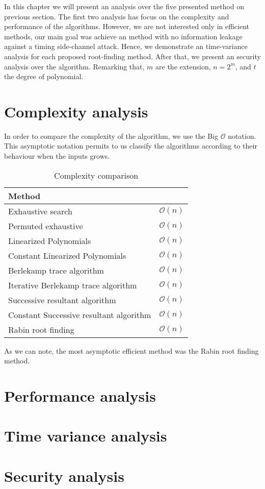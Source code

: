 In this chapter we will present an analysis over the five presented method on previous section. The first two analysis has focus on the complexity and performance of the algorithms. However, we are not interested only in efficient methods, our main goal was achieve an method with no information leakage against a timing side-channel attack. Hence, we demonstrate an time-variance analysis for each proposed root-finding method. After that, we present an security analysis over the algorithm. Remarking that, $m$ are the extension, $n = 2^m$, and $t$ the degree of polynomial.

\section{Complexity analysis}
In order to compare the complexity of the algorithm, we use the Big $\mathcal{O}$ notation. This asymptotic notation permits to us classify the algorithms according to their behaviour when the inputs grows. 




\begin{table}[ht]
\centering
\label{tab:complexity}
\caption{Complexity comparison}
\begin{tabular}{ll}
Method                                  &                \\ \hline
Exhaustive search                       & $\mathcal{O}(n)$ \\
Permuted exhaustive                     & $\mathcal{O}(n)$ \\
Linearized Polynomials                  & $\mathcal{O}(n)$ \\
Constant Linearized Polynomials         & $\mathcal{O}(n)$ \\
Berlekamp trace algorithm               & $\mathcal{O}(n)$ \\
Iterative Berlekamp trace algorithm     & $\mathcal{O}(n)$ \\
Successive resultant algorithm          & $\mathcal{O}(n)$ \\
Constant Successive resultant algorithm & $\mathcal{O}(n)$ \\
Rabin root finding                      & $\mathcal{O}(n)$
\end{tabular}
\end{table}

As we can note, the most asymptotic efficient method was the Rabin root finding method.

\section{Performance analysis}
\section{Time variance analysis}
\section{Security analysis}